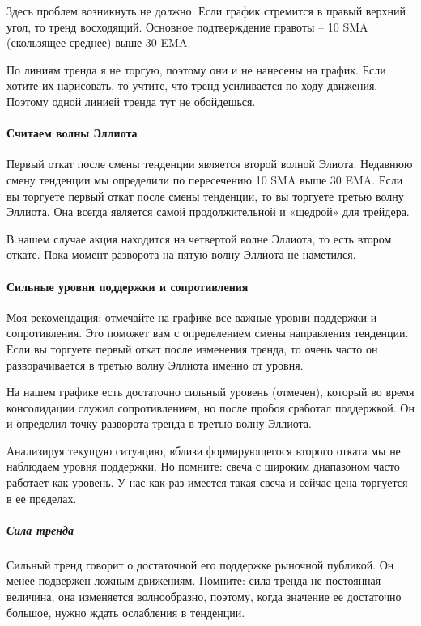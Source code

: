 \documentclass[a5paper]{article}
\begin{document}
Здесь проблем возникнуть не должно. Если график стремится в правый верхний угол, то тренд восходящий. Основное подтверждение правоты – 10 SMA (скользящее среднее) выше 30 EMA.

По линиям тренда я не торгую, поэтому они и не нанесены на
график. Если хотите их нарисовать, то учтите, что тренд усиливается по
ходу движения. Поэтому одной линией тренда тут не обойдешься.

\paragraph{Считаем волны Эллиота}

Первый откат после смены тенденции является второй волной Элиота. Недавнюю смену тенденции мы определили по пересечению 10 SMA выше 30 EMA. Если вы торгуете первый откат после смены тенденции, то вы торгуете третью волну Эллиота. Она всегда является самой продолжительной и «щедрой» для трейдера.

В нашем случае акция находится на четвертой волне Эллиота, то есть
втором откате. Пока момент разворота на пятую волну Эллиота не
наметился.

\paragraph{Сильные уровни поддержки и сопротивления}


Моя рекомендация: отмечайте на графике все важные уровни поддержки и сопротивления. Это поможет вам с определением смены направления тенденции. Если вы торгуете первый откат после изменения тренда, то очень часто он разворачивается в третью волну Эллиота именно от уровня.

На нашем графике есть достаточно сильный уровень (отмечен), который во время консолидации служил сопротивлением, но после пробоя сработал поддержкой. Он и определил точку разворота тренда в третью волну Эллиота.

Анализируя текущую ситуацию, вблизи формирующегося второго отката мы
не наблюдаем уровня поддержки. Но помните: свеча с широким диапазоном
часто работает как уровень. У нас как раз имеется такая свеча и сейчас
цена торгуется в ее пределах.

\subparagraph{Сила тренда}

Сильный тренд говорит о достаточной его поддержке рыночной публикой. Он менее подвержен ложным движениям. Помните: сила тренда не постоянная величина, она изменяется волнообразно, поэтому, когда значение ее достаточно большое, нужно ждать ослабления в тенденции.
\end{document}
